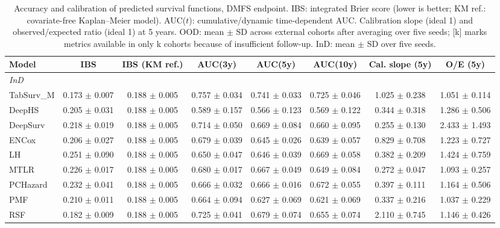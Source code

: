 \begin{table}[t]
\centering
\caption{Accuracy and calibration of predicted survival functions, DMFS endpoint. IBS: integrated Brier score (lower is better; KM ref.: covariate-free Kaplan--Meier model). AUC($t$): cumulative/dynamic time-dependent AUC. Calibration slope (ideal 1) and observed/expected ratio (ideal 1) at 5 years. OOD: mean $\pm$ SD across external cohorts after averaging over five seeds; [k] marks metrics available in only k cohorts because of insufficient follow-up. InD: mean $\pm$ SD over five seeds.}
\label{tab:calibration_dmfs}
\footnotesize
\setlength{\tabcolsep}{3pt}
\begin{tabular}{lccccccc}
\toprule
Model & IBS & IBS (KM ref.) & AUC(3y) & AUC(5y) & AUC(10y) & Cal. slope (5y) & O/E (5y) \\
\midrule
\multicolumn{8}{l}{\textit{InD}} \\
TabSurv\_M & 0.173 $\pm$ 0.007 & 0.188 $\pm$ 0.005 & 0.757 $\pm$ 0.034 & 0.741 $\pm$ 0.033 & 0.725 $\pm$ 0.046 & 1.025 $\pm$ 0.238 & 1.051 $\pm$ 0.114 \\
DeepHS & 0.205 $\pm$ 0.031 & 0.188 $\pm$ 0.005 & 0.589 $\pm$ 0.157 & 0.566 $\pm$ 0.123 & 0.569 $\pm$ 0.122 & 0.344 $\pm$ 0.318 & 1.286 $\pm$ 0.506 \\
DeepSurv & 0.218 $\pm$ 0.019 & 0.188 $\pm$ 0.005 & 0.714 $\pm$ 0.050 & 0.669 $\pm$ 0.084 & 0.660 $\pm$ 0.095 & 0.255 $\pm$ 0.130 & 2.433 $\pm$ 1.493 \\
ENCox & 0.206 $\pm$ 0.027 & 0.188 $\pm$ 0.005 & 0.679 $\pm$ 0.039 & 0.645 $\pm$ 0.026 & 0.639 $\pm$ 0.057 & 0.829 $\pm$ 0.708 & 1.223 $\pm$ 0.727 \\
LH & 0.251 $\pm$ 0.090 & 0.188 $\pm$ 0.005 & 0.650 $\pm$ 0.047 & 0.646 $\pm$ 0.039 & 0.669 $\pm$ 0.058 & 0.382 $\pm$ 0.209 & 1.424 $\pm$ 0.759 \\
MTLR & 0.226 $\pm$ 0.017 & 0.188 $\pm$ 0.005 & 0.680 $\pm$ 0.017 & 0.667 $\pm$ 0.049 & 0.649 $\pm$ 0.084 & 0.272 $\pm$ 0.047 & 1.093 $\pm$ 0.257 \\
PCHazard & 0.232 $\pm$ 0.041 & 0.188 $\pm$ 0.005 & 0.666 $\pm$ 0.032 & 0.666 $\pm$ 0.016 & 0.672 $\pm$ 0.055 & 0.397 $\pm$ 0.111 & 1.164 $\pm$ 0.506 \\
PMF & 0.210 $\pm$ 0.011 & 0.188 $\pm$ 0.005 & 0.664 $\pm$ 0.094 & 0.627 $\pm$ 0.069 & 0.621 $\pm$ 0.069 & 0.337 $\pm$ 0.216 & 1.037 $\pm$ 0.229 \\
RSF & 0.182 $\pm$ 0.009 & 0.188 $\pm$ 0.005 & 0.725 $\pm$ 0.041 & 0.679 $\pm$ 0.074 & 0.655 $\pm$ 0.074 & 2.110 $\pm$ 0.745 & 1.146 $\pm$ 0.426 \\

\end{tabular}
\end{table}
